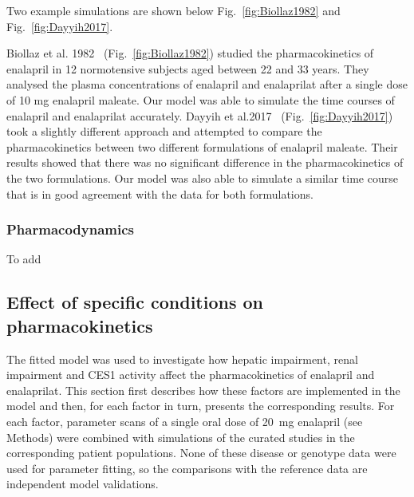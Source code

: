 Two example simulations are shown below Fig.~\ref{fig:Biollaz1982} and Fig.~\ref{fig:Dayyih2017}.



Biollaz et al. 1982~\cite{Biollaz1982} (Fig.~\ref{fig:Biollaz1982}) studied the pharmacokinetics of enalapril in 12 normotensive subjects aged between 22 and 33 years. They analysed the plasma concentrations of enalapril and enalaprilat after a single dose of 10 mg enalapril maleate. Our model was able to simulate the time courses of enalapril and enalaprilat accurately. Dayyih et al.2017~\cite{Dayyih2017} (Fig.~\ref{fig:Dayyih2017}) took a slightly different approach and attempted to compare the pharmacokinetics between two different formulations of enalapril maleate. Their results showed that there was no significant difference in the pharmacokinetics of the two formulations. Our model was also able to simulate a similar time course that is in good agreement with the data for both formulations.

\subsubsection{Pharmacodynamics}
\label{sec:results_pd_simulations}
To add

\subsection{Effect of specific conditions on pharmacokinetics}
\label{sec:results_conditions}
The fitted model was used to investigate how hepatic impairment, renal impairment and CES1 activity affect the pharmacokinetics of enalapril and enalaprilat. This section first describes how these factors are implemented in the model and then, for each factor in turn, presents the corresponding results. For each factor, parameter scans of a single oral dose of 20~mg enalapril (see Methods) were combined with simulations of the curated studies in the corresponding patient populations. None of these disease or genotype data were used for parameter fitting, so the comparisons with the reference data are independent model validations.

